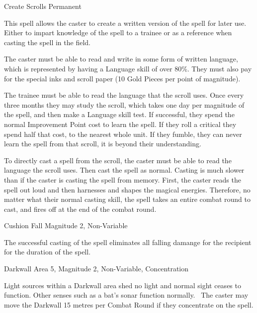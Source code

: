 \begin{rpg-spell}
{Create Scrolls}
{Permanent}

This spell allows the caster to create a written version of the spell for later use. Either to impart knowledge of the spell to a trainee or as a reference when casting the spell in the field.

\begin{rpg-list}
\item The caster must be able to read and write in some form of written language, which is represented by having a Language skill of over 80\%. They must also pay for the special inks and scroll paper (10 Gold Pieces per point of magnitude).
\item The trainee must be able to read the language that the scroll uses. Once every three months they may study the scroll, which takes one day per magnitude of the spell, and then make a Language skill test. If successful, they spend the normal Improvement Point cost to learn the spell. If they roll a critical they spend half that cost, to the nearest whole unit. If they fumble, they can never learn the spell from that scroll, it is beyond their understanding.
\item To directly cast a spell from the scroll, the caster must be able to read the language the scroll uses. Then cast the spell as normal. Casting is much slower than if the caster is casting the spell from memory. First, the caster reads the spell out loud and then harnesses and shapes the magical energies. Therefore, no matter what their normal casting skill, the spell takes an entire combat round to cast, and fires off at the end of the combat round.
\end{rpg-list}
\end{rpg-spell}


\begin{rpg-spell}
{Cushion Fall}
{Magnitude 2, Non-Variable}

The successful casting of the spell eliminates all falling damange for the recipient for the duration of the spell.
\end{rpg-spell}


\begin{rpg-spell}
{Darkwall}
{Area 5, Magnitude 2, Non-Variable, Concentration}

Light sources within a Darkwall area shed no light and normal sight ceases to function. Other senses such as a bat’s sonar function normally. 
The caster may move the Darkwall 15 metres per Combat Round if they concentrate on the spell.
\end{rpg-spell}


